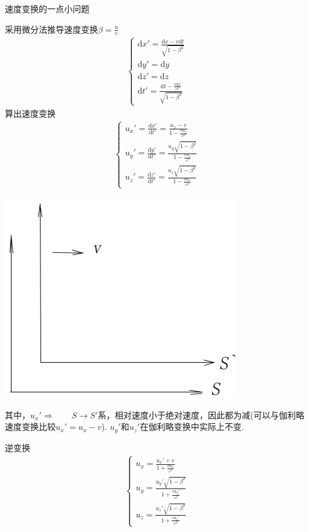 \documentclass[a4paper,titlepage,onecolmn]{ctexart}
\newcommand{\di}[1]{\mathrm{d}#1}
\begin{document}
\begin{section}{速度变换的一点小问题}
\begin{multicols}{2}
采用微分法推导速度变换\hspace{2em}$\beta=\frac{u}{c}$
\begin{align*}
\begin{cases}
\di x'=\frac{\di x-v\di t}{\sqrt{1-\beta^2}}\\[6pt]
\di y'=\di y\\[6pt]
\di z'=\di z\\[6pt]
\di t'=\frac{\di t-\frac{v\di x}{c^2}}{\sqrt{1-\beta^2}}
\end{cases}
\end{align*}
算出速度变换
\begin{align*}
\begin{cases}
u_x'=\frac{\di x'}{\di t'}=\frac{u_x-v}{1-\frac{vu_x}{c^2}}\\[6pt]
u_y'=\frac{\di y'}{\di t'}=\frac{u_y\sqrt{1-\beta^2}}{1-\frac{vu_x}{c^2}}\\[6pt]
u_z'=\frac{\di z'}{\di t'}=\frac{u_z\sqrt{1-\beta^2}}{1-\frac{vu_x}{c^2}}
\end{cases}
\end{align*}

\hspace{4em}
\includegraphics[scale=0.6]{Chp5_addin_illus (3).jpg}
\end{multicols}
其中，$u_x'\Rightarrow\hspace{2em} S\rightarrow S'$系，相对速度小于绝对速度，因此都为减(可以与伽利略速度变换比较$u_x'=u_x-v$).
$u_y'$和$u_z'$在伽利略变换中实际上不变.

逆变换
\begin{align*}
\begin{cases}
u_x=\frac{u_x'+v}{1+\frac{vu_x}{c^2}}\\[6pt]
u_y=\frac{u_y'\sqrt{1-\beta^2}}{1+\frac{vu_y'}{c^2}}\\[6pt]
u_z=\frac{u_z'\sqrt{1-\beta^2}}{1+\frac{vu_z'}{c^2}}
\end{cases}
\end{align*}


\end{section}
\end{document}
